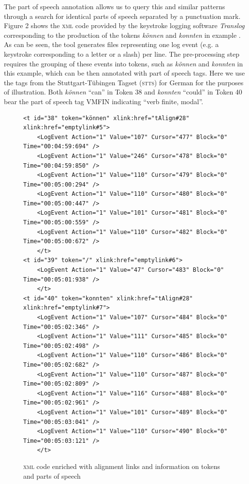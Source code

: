 \documentclass[output=paper]{LSP/langsci}
\begin{document}
The part of speech annotation allows us to query this and similar patterns through a search for identical parts of speech separated by a punctuation mark. 
Figure 2 shows the \textsc{xml} code provided by the keystroke logging software \textit{Translog} corresponding to the production of the tokens \textit{können} and \textit{konnten} in example . As can be seen, the tool generates files representing one log event (e.g. a keystroke corresponding to a letter or a slash) per line. The pre-processing step requires the grouping of these events into tokens, such as \textit{können} and \textit{konnten} in this example, which can be then annotated with part of speech tags. Here we use the tags from the Stuttgart-Tübingen Tagset (\textsc{stts}) for German \citep{Schiller1999} for the purposes of illustration. Both \textit{können} “can” in Token 38 and \textit{konnten} “could” in Token 40 bear the part of speech tag VMFIN indicating “verb finite, modal”. 


\begin{figure}

\caption{\textsc{xml} code enriched with alignment links and information on tokens and parts of speech}
\begin{lstlisting}
<t id="38" token="können" xlink:href="tAlign#28" xlink:href="emptylink#5">
    <LogEvent Action="1" Value="107" Cursor="477" Block="0" Time="00:04:59:694" />
    <LogEvent Action="1" Value="246" Cursor="478" Block="0" Time="00:04:59:850" />
    <LogEvent Action="1" Value="110" Cursor="479" Block="0" Time="00:05:00:294" />
    <LogEvent Action="1" Value="110" Cursor="480" Block="0" Time="00:05:00:447" />
    <LogEvent Action="1" Value="101" Cursor="481" Block="0" Time="00:05:00:559" />
    <LogEvent Action="1" Value="110" Cursor="482" Block="0" Time="00:05:00:672" />
	</t>
<t id="39" token="/" xlink:href="emptylink#6">
    <LogEvent Action="1" Value="47" Cursor="483" Block="0" Time="00:05:01:938" />
	</t>
<t id="40" token="konnten" xlink:href="tAlign#28" xlink:href="emptylink#7">
    <LogEvent Action="1" Value="107" Cursor="484" Block="0" Time="00:05:02:346" />
    <LogEvent Action="1" Value="111" Cursor="485" Block="0" Time="00:05:02:498" />
    <LogEvent Action="1" Value="110" Cursor="486" Block="0" Time="00:05:02:682" />
    <LogEvent Action="1" Value="110" Cursor="487" Block="0" Time="00:05:02:809" />
    <LogEvent Action="1" Value="116" Cursor="488" Block="0" Time="00:05:02:961" />
    <LogEvent Action="1" Value="101" Cursor="489" Block="0" Time="00:05:03:041" />
    <LogEvent Action="1" Value="110" Cursor="490" Block="0" Time="00:05:03:121" />
	</t>
\end{lstlisting}

\end{figure} 
\end{document}
